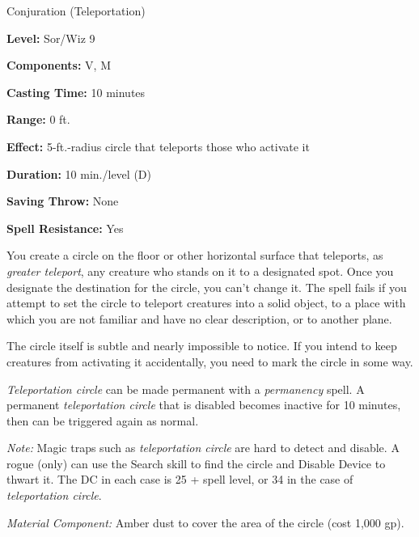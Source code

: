 
Conjuration (Teleportation)

\textbf{Level:} Sor/Wiz 9

\textbf{Components:} V, M

\textbf{Casting Time:} 10 minutes

\textbf{Range:} 0 ft.

\textbf{Effect:} 5-ft.-radius circle that teleports those who activate it

\textbf{Duration:} 10 min./level (D)

\textbf{Saving Throw:} None

\textbf{Spell Resistance:} Yes

You create a circle on the floor or other horizontal surface that teleports, as 
\textit{greater teleport}, any creature who stands on it to a designated spot. 
Once you designate the destination for the circle, you can't change it. The spell 
fails if you attempt to set the circle to teleport creatures into a solid object, 
to a place with which you are not familiar and have no clear description, or to 
another plane.

The circle itself is subtle and nearly impossible to notice. If you intend to keep 
creatures from activating it accidentally, you need to mark the circle in some 
way.

\textit{Teleportation circle} can be made permanent with a \textit{permanency} spell. 
A permanent \textit{teleportation circle} that is disabled becomes inactive for 
10 minutes, then can be triggered again as normal.

\textit{Note:} Magic traps such as \textit{teleportation circle} are hard to detect 
and disable. A rogue (only) can use the Search skill to find the circle and Disable 
Device to thwart it. The DC in each case is 25 + spell level, or 34 in the case 
of \textit{teleportation circle}.

\textit{Material Component:} Amber dust to cover the area of the circle (cost 1,000 
gp).


